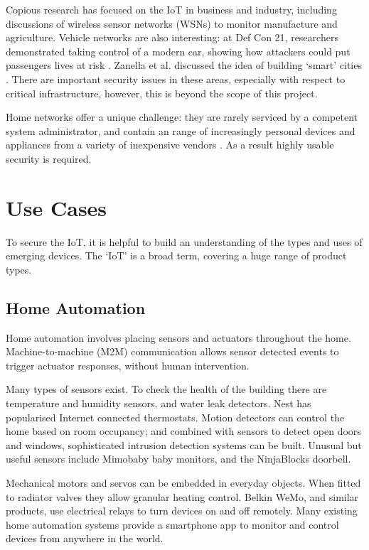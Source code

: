 \documentclass[10pt,journal,compsoc]{IEEEtran}
\begin{document}
Copious research has focused on the IoT in business and industry, including
discussions of wireless sensor networks (WSNs) to monitor manufacture and
agriculture. Vehicle networks are also interesting: at Def Con 21, researchers
demonstrated taking control of a modern car, showing how attackers could put
passengers lives at risk \cite{Illera2014}. Zanella et al. discussed the idea
of building `smart' cities \cite{Zanella2014}. There are important security
issues in these areas, especially with respect to critical infrastructure,
however, this is beyond the scope of this project.  

Home networks offer a unique challenge: they are rarely serviced by a competent
system administrator, and contain an range of increasingly personal devices and
appliances from a variety of inexpensive vendors \cite{Denning2013}. As a
result highly usable security is required.  

\section{Use Cases}
To secure the IoT, it is helpful to build an understanding of the types and
uses of emerging devices. The `IoT' is a broad term, covering a huge range of
product types.

\subsection{Home Automation}
Home automation involves placing sensors and actuators throughout the home.
Machine-to-machine (M2M) communication allows sensor detected events to trigger
actuator responses, without human intervention. 

Many types of sensors exist. To check the health of the building there are
temperature and humidity sensors, and water leak detectors. Nest has
popularised Internet connected thermostats. Motion detectors can control the
home based on room occupancy; and combined with sensors to detect open doors
and windows, sophisticated intrusion detection systems can be built. Unusual
but useful sensors include Mimobaby baby monitors, and the NinjaBlocks
doorbell.

Mechanical motors and servos can be embedded in everyday objects. When fitted
to radiator valves they allow granular heating control. Belkin WeMo, and
similar products, use electrical relays to turn devices on and off remotely.
Many existing home automation systems provide a smartphone app to monitor and
control devices from anywhere in the world. 
\end{document}
